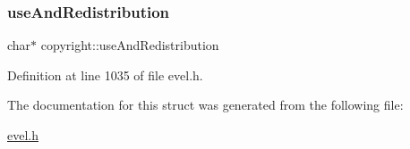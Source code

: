 \hypertarget{structcopyright_ad8f21ad8c30c034839fbd41340439a87}{}\label{structcopyright_ad8f21ad8c30c034839fbd41340439a87} 
\subsubsection{\texorpdfstring{use\+And\+Redistribution}{useAndRedistribution}}
{\footnotesize\ttfamily char$\ast$ copyright\+::use\+And\+Redistribution}



Definition at line 1035 of file evel.\+h.



The documentation for this struct was generated from the following file\+:\begin{DoxyCompactItemize}
\item 
\hyperlink{evel_8h}{evel.\+h}\end{DoxyCompactItemize}
